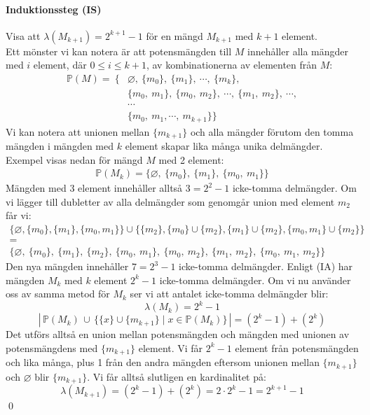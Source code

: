 \paragraph{Induktionssteg (IS)} Visa att $\lambda(M_{k+1})=2^{k+1}-1$ för en mängd $M_{k+1}$ med $k+1$ element.\\
Ett mönster vi kan notera är att potensmängden till $M$ innehåller alla mängder med $i$ element, där $0\le i\le k+1$, av kombinationerna av elementen från $M$:
\begin{align*}
\mathbb{P}(M) =\ \{&\varnothing,\ \{m_0\},\ \{m_1\},\ \cdots, \ \{m_k\},\\[5pt]
& \{m_0,\ m_1\},\ \{m_0,\ m_2\},\  \cdots,\ \{m_1,\ m_2\},\ \cdots,\\[5pt]
& \cdots \\[5pt]
& \{m_0,\ m_1, \cdots, \ m_{k+1}\}\}
\end{align*}
Vi kan notera att unionen mellan $\{m_{k+1}\}$ och alla mängder förutom den tomma mängden i mängden med $k$ element skapar lika många unika delmängder. Exempel visas nedan för mängd $M$ med 2 element:
\begin{align*}
    \mathbb{P}(M_k) = \{\varnothing,\ \{m_0\},\ \{m_1\},\ \{m_0,\ m_1\}\}
\end{align*}
Mängden med 3 element innehåller alltså $3=2^2-1$ icke-tomma delmängder. Om vi lägger till dubletter av alla delmängder som genomgår union med element $m_2$ får vi:
\begin{gather*}
\{\varnothing, \{m_0\}, \{m_1\}, \{m_0, m_1\}\}\cup \{\{m_2\}, \{m_0\}\cup\{m_2\}, \{m_1\}\cup\{m_2\}, \{m_0, m_1\}\cup\{m_2\}\} \\[5pt]
=\\[5pt]
\{\varnothing,\ \{m_0\},\ \{m_1\},\ \{m_2\},\ \{m_0,\ m_1\},\ \{m_0,\ m_2\},\ \{m_1,\ m_2\},\ \{m_0,\ m_1,\ m_2\}\}
\end{gather*}
Den nya mängden innehåller $7=2^3-1$ icke-tomma delmängder. Enligt (IA) har mängden $M_k$ med $k$ element $2^k-1$ icke-tomma delmängder. Om vi nu använder oss av samma metod för $M_k$ ser vi att antalet icke-tomma delmängder blir:
\[\lambda(M_k) = 2^k-1\]
\[   |\, \mathbb{P}(M_k)\, \cup\, \{\{x\} \cup \{m_{k+1}\} \mid x\in \mathbb{P}(M_k) \} \, | = (2^k-1)+(2^k) \]
Det utförs alltså en union mellan potensmängden och mängden med unionen av potensmängdens med $\{m_{k+1}\}$ element. Vi får $2^k-1$ element från potensmängden och lika många, plus 1 från den andra mängden eftersom unionen mellan $\{m_{k+1}\}$ och $\varnothing$ blir $\{m_{k+1}\}$. Vi får alltså slutligen en kardinalitet på:
\[\lambda(M_{k+1})=(2^k-1)+(2^k) = 2\cdot 2^k-1 = 2^{k+1}-1\]
\hfill\qed
